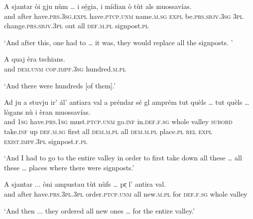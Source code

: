 \begin{linenumbers}
\gll A sjantar òi gju nùm … i sé̱gia\footnotemark, i mídian ò tùt als muossavías.\footnotemark\\
and after have.\textsc{prs.3sg.expl} have.\textsc{ptcp.unm} name.\textsc{m.sg} {} \textsc{expl} be.\textsc{prs.sbjv.3sg}  \textsc{3pl} change.\textsc{prs.sbjv.3pl} out all \textsc{def.m.pl} signpost.\textsc{pl}\\
\end{linenumbers}
\medskip
\glt `And after this, one had to … it was, they would replace all the signposts. '
\medskip

\begin{linenumbers}
\gll  A quaj èra tschians.   \\
and \textsc{dem.unm} \textsc{cop.impf.3sg} hundred.\textsc{m.pl}\\
\end{linenumbers}
\medskip
\glt `And there were hundreds [of them].'
\medskip

\begin{linenumbers}
\gll Ad ju a stuvju ir’ ál’ antiara val a préndar sé gl amprém tut quèls … tut quèls … lògans nù i èran muossavías.\\
and \textsc{1sg} have.\textsc{prs.1sg} must.\textsc{ptcp.unm} go.\textsc{inf} in.\textsc{def.f.sg} whole valley \textsc{subord} take.\textsc{inf} up \textsc{def.m.sg} first all \textsc{dem.m.pl} {} all \textsc{dem.m.pl} {} place.\textsc{pl} \textsc{rel} \textsc{expl} \textsc{exist.impf.3pl} signpost.\textsc{f.pl}\\
\end{linenumbers}
\medskip
\glt `And I had to go to the entire valley in order to first take down all these … all these … places where there were signposts.'
\medskip

\begin{linenumbers}
\gll  A sjantar ... òni ampustau tùt nùfs … pr̩ l’ antira val.  \\
and after {} have.\textsc{prs.3pl.3pl} order.\textsc{ptcp.unm} all new.\textsc{m.pl} {} for \textsc{def.f.sg} whole valley \\
\end{linenumbers}
\medskip
\glt `And then ... they ordered all new ones … for the entire valley.'
\medskip

